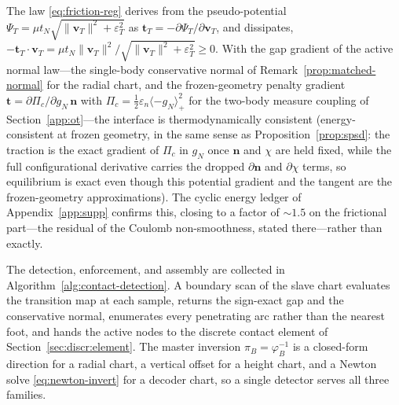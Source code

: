 \documentclass{svjour3}                 %
\newcommand{\norm}[1]{\lVert#1\rVert}
\newcommand{\nbf}{\bm{n}}
\newcommand{\tbf}{\bm{t}}
\newcommand{\vbf}{\bm{v}}
\newcommand{\gn}{g_{\scriptscriptstyle N}}
\newcommand{\map}[1]{\varphi_{#1}}
\newcommand{\pos}[1]{\langle #1\rangle_{+}}
\begin{document}
\begin{remark}[Dissipation]\label{cor:second-law}
The law \eqref{eq:friction-reg} derives from the pseudo-potential $\Psi_T=\mu t_N\sqrt{\norm{\vbf_T}^2+
\varepsilon_T^2}$ as $\tbf_T=-\partial\Psi_T/\partial\vbf_T$, and dissipates,
$-\tbf_T\!\cdot\vbf_T=\mu t_N\norm{\vbf_T}^2/\sqrt{\norm{\vbf_T}^2+\varepsilon_T^2}\ge0$. With the gap gradient of
the active normal law---the single-body conservative normal of Remark~\ref{prop:matched-normal} for the radial
chart, and the frozen-geometry penalty gradient $\tbf=\partial\Pi_c/\partial\gn\,\nbf$ with
$\Pi_c=\tfrac12\varepsilon_n\pos{-\gn}^2$ for the two-body measure coupling of Section~\ref{app:ot}---the
interface is thermodynamically consistent (energy-consistent at frozen geometry, in the same sense as
Proposition~\ref{prop:spsd}: the traction is the exact gradient of $\Pi_c$ in $\gn$ once $\nbf$ and $\chi$ are
held fixed, while the full configurational derivative carries the dropped $\partial\nbf$ and $\partial\chi$ terms,
so equilibrium is exact even though this potential gradient and the tangent are the frozen-geometry
approximations). The cyclic energy ledger of Appendix~\ref{app:supp} confirms this, closing to a factor of
$\sim1.5$ on the frictional part---the residual of the Coulomb non-smoothness, stated there---rather than exactly.
\end{remark}

The detection, enforcement, and assembly are collected in Algorithm~\ref{alg:contact-detection}. A boundary scan
of the slave chart evaluates the transition map at each sample, returns the sign-exact gap and the conservative
normal, enumerates every penetrating arc rather than the nearest foot, and hands the active nodes to the
discrete contact element of Section~\ref{sec:discr:element}. The master inversion $\pi_B=\map{B}^{-1}$ is a
closed-form direction for a radial chart, a vertical offset for a height chart, and a Newton solve
\eqref{eq:newton-invert} for a decoder chart, so a single detector serves all three families.
\end{document}
